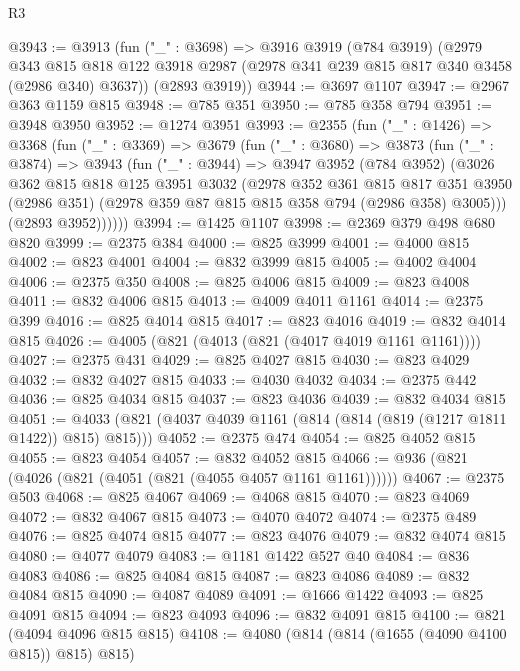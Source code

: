 \begin{lexlean}{R3}
\begin{coremodule}
@3943 := @3913
    (fun ("_" : @3698) =>
    @3916
      @3919
      (@784 @3919)
      (@2979
        @343
        @815
        @818
        @122
        @3918
        @2987
        (@2978 @341 @239 @815 @817 @340 @3458 (@2986 @340) @3637))
      (@2893 @3919))
@3944 := @3697 @1107
@3947 := @2967 @363 @1159 @815
@3948 := @785 @351
@3950 := @785 @358 @794
@3951 := @3948 @3950
@3952 := @1274 @3951
@3993 := @2355
    (fun ("_" : @1426) =>
    @3368
      (fun ("_" : @3369) =>
      @3679
        (fun ("_" : @3680) =>
        @3873
          (fun ("_" : @3874) =>
          @3943
            (fun ("_" : @3944) =>
            @3947
              @3952
              (@784 @3952)
              (@3026
                @362
                @815
                @818
                @125
                @3951
                @3032
                (@2978
                  @352
                  @361
                  @815
                  @817
                  @351
                  @3950
                  (@2986 @351)
                  (@2978 @359 @87 @815 @815 @358 @794 (@2986 @358) @3005)))
              (@2893 @3952))))))
@3994 := @1425 @1107
@3998 := @2369 @379 @498 @680 @820
@3999 := @2375 @384
@4000 := @825 @3999
@4001 := @4000 @815
@4002 := @823 @4001
@4004 := @832 @3999 @815
@4005 := @4002 @4004
@4006 := @2375 @350
@4008 := @825 @4006 @815
@4009 := @823 @4008
@4011 := @832 @4006 @815
@4013 := @4009 @4011 @1161
@4014 := @2375 @399
@4016 := @825 @4014 @815
@4017 := @823 @4016
@4019 := @832 @4014 @815
@4026 := @4005 (@821 (@4013 (@821 (@4017 @4019 @1161 @1161))))
@4027 := @2375 @431
@4029 := @825 @4027 @815
@4030 := @823 @4029
@4032 := @832 @4027 @815
@4033 := @4030 @4032
@4034 := @2375 @442
@4036 := @825 @4034 @815
@4037 := @823 @4036
@4039 := @832 @4034 @815
@4051 := @4033 (@821 (@4037 @4039 @1161 (@814 (@814 (@819 (@1217 @1811 @1422)) @815) @815)))
@4052 := @2375 @474
@4054 := @825 @4052 @815
@4055 := @823 @4054
@4057 := @832 @4052 @815
@4066 := @936 (@821 (@4026 (@821 (@4051 (@821 (@4055 @4057 @1161 @1161))))))
@4067 := @2375 @503
@4068 := @825 @4067
@4069 := @4068 @815
@4070 := @823 @4069
@4072 := @832 @4067 @815
@4073 := @4070 @4072
@4074 := @2375 @489
@4076 := @825 @4074 @815
@4077 := @823 @4076
@4079 := @832 @4074 @815
@4080 := @4077 @4079
@4083 := @1181 @1422 @527 @40
@4084 := @836 @4083
@4086 := @825 @4084 @815
@4087 := @823 @4086
@4089 := @832 @4084 @815
@4090 := @4087 @4089
@4091 := @1666 @1422
@4093 := @825 @4091 @815
@4094 := @823 @4093
@4096 := @832 @4091 @815
@4100 := @821 (@4094 @4096 @815 @815)
@4108 := @4080 (@814 (@814 (@1655 (@4090 @4100 @815)) @815) @815)

\end{coremodule}
\end{lexlean}
